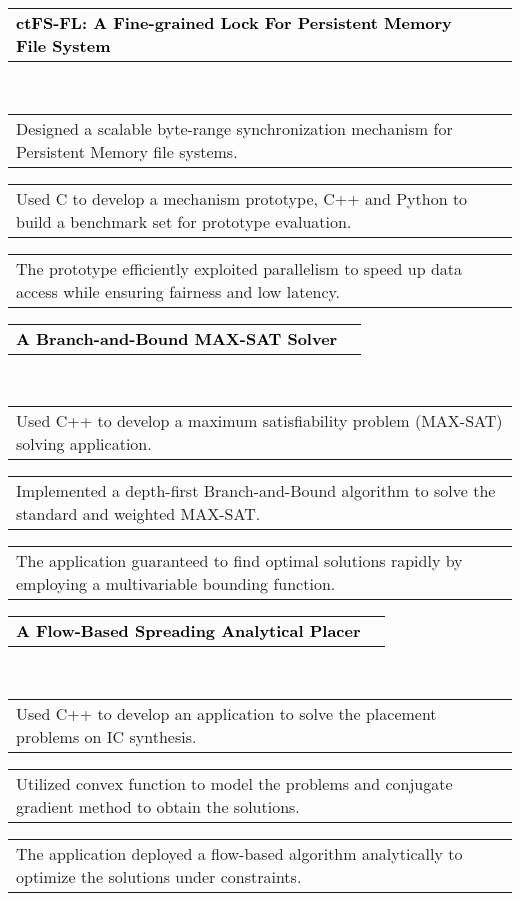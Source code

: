 \documentclass[letterpaper,10pt,english]{article}
\newcommand{\mpwidth}{\linewidth-\fboxsep-\fboxsep}
\newcommand{\cvlist}[1] {
	\begin{itemize}[left=5pt,nosep]{#1}\end{itemize}
}
\newcommand{\cvtext}[1] {
	\begin{tabular*}{1\mpwidth}{p{0.98\mpwidth}}
		\parbox{1\mpwidth}{#1}
	\end{tabular*}
}
\begin{document}
\parbox{\mpwidth}{
	\begin{tabular*}{1\mpwidth}{p{1\mpwidth}  r}
		\textcolor{black}{\textbf{ctFS-FL: A Fine-grained Lock For Persistent Memory File System}} \\
	\end{tabular*}\\[-8pt]
	\cvlist{
		\item{\cvtext{Designed a scalable byte-range synchronization mechanism for Persistent Memory file systems.}}
		\item{\cvtext{Used C to develop a mechanism prototype, C++ and Python to build a benchmark set for prototype evaluation.}}
		\item{\cvtext{The prototype efficiently exploited parallelism to speed up data access while ensuring fairness and low latency.}}
	}
}
\vspace{14pt}

\parbox{\mpwidth}{
	\begin{tabular*}{1\mpwidth}{p{1\mpwidth}  r}
		\textcolor{black}{\textbf{A Branch-and-Bound MAX-SAT Solver}} \\
	\end{tabular*}\\[-8pt]
	\cvlist{
		\item{\cvtext{Used C++ to develop a maximum satisfiability problem (MAX-SAT) solving application.}}
		\item{\cvtext{Implemented a depth-first Branch-and-Bound algorithm to solve the standard and weighted MAX-SAT.}}
		\item{\cvtext{The application guaranteed to find optimal solutions rapidly by employing a multivariable bounding function.}}
	}
}
\vspace{14pt}

\parbox{\mpwidth}{
	\begin{tabular*}{1\mpwidth}{p{1\mpwidth}  r}
		\textcolor{black}{\textbf{A Flow-Based Spreading Analytical Placer}} \\
	\end{tabular*}\\[-8pt]
	\cvlist{
		\item{\cvtext{Used C++ to develop an application to solve the placement problems on IC synthesis.}}
		\item{\cvtext{Utilized convex function to model the problems and conjugate gradient method to obtain the solutions.}}
		\item{\cvtext{The application deployed a flow-based algorithm analytically to optimize the solutions under constraints.}}
	}
}
\vspace{14pt}
\end{document}
